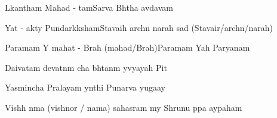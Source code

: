 \documentclass[20pt]{article}
\begin{document}
{L{\oh}kan{\A}tham Mahad - {\bh}{\oo}tam}{Sarva Bh{\oo}tha {\bh}av{\oh}d{\bh}avam}

{Yat - {\bh}akty{\A} Pundar{\ee}k{\A}ksham}{Stavaih arch{\e}n narah sad{\A} (Stavair/arch{\e}n/narah)}

{Paramam Y{\oh} mahat - Brah{\ma} (mahad/Brah{\ma})}{Paramam Yah Par{\A}yanam}

{Daivatam devat{\A}n{\A}m cha}{ bh{\oo}tan{\A}m y{\oh}vyayah Pit{\A}}

{Yasmin{\sh}cha Pralayam y{\A}nthi }{Punar{\e}va yuga{\ksh}ay{\e}}

{Vish{\no}h \dash n{\A}ma (vishnor / nama) sahasram m{\e}y} { Shrunu p{\A}pa {\Bh}ay{\A}paham}




\end{document}

